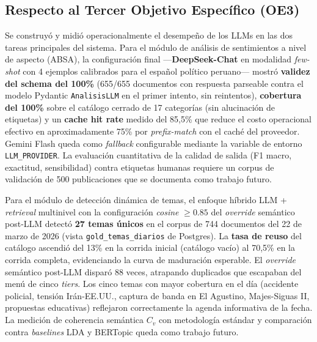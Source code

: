 \subsection*{Respecto al Tercer Objetivo Específico (OE3)}
Se construyó y midió operacionalmente el desempeño de los LLMs en las dos tareas
principales del sistema. Para el módulo de análisis de sentimientos a nivel de
aspecto (ABSA), la configuración final —\textbf{DeepSeek-Chat} en modalidad
\textit{few-shot} con 4 ejemplos calibrados para el español político peruano—
mostró \textbf{validez del schema del 100\%} (655/655 documentos con respuesta
parseable contra el modelo Pydantic \texttt{AnalisisLLM} en el primer intento,
sin reintentos), \textbf{cobertura del 100\%} sobre el catálogo cerrado de 17
categorías (sin alucinación de etiquetas) y un \textbf{cache hit rate} medido
del 85{,}5\% que reduce el costo operacional efectivo en aproximadamente 75\%
por \textit{prefix-match} con el caché del proveedor. Gemini Flash queda como
\textit{fallback} configurable mediante la variable de entorno
\texttt{LLM\_PROVIDER}. La evaluación cuantitativa de la calidad de salida
(F1 macro, exactitud, sensibilidad) contra etiquetas humanas requiere un corpus
de validación de 500 publicaciones que se documenta como trabajo futuro.

Para el módulo de detección dinámica de temas, el enfoque híbrido LLM +
\textit{retrieval} multinivel con la configuración \textit{cosine} $\geq 0.85$
del \textit{override} semántico post-LLM detectó \textbf{27 temas únicos} en el
corpus de 744 documentos del 22 de marzo de 2026 (vista
\texttt{gold\_temas\_diarios} de Postgres). La \textbf{tasa de reuso} del catálogo
ascendió del 13\% en la corrida inicial (catálogo vacío) al 70{,}5\% en la
corrida completa, evidenciando la curva de maduración esperable. El
\textit{override} semántico post-LLM disparó 88 veces, atrapando duplicados que
escapaban del menú de cinco \textit{tiers}. Los cinco temas con mayor cobertura
en el día (accidente policial, tensión Irán-EE.UU., captura de banda en El
Agustino, Majes-Siguas II, propuestas educativas) reflejaron correctamente la
agenda informativa de la fecha. La medición de coherencia semántica $C_v$ con
metodología estándar y comparación contra \textit{baselines} LDA y BERTopic
queda como trabajo futuro.
